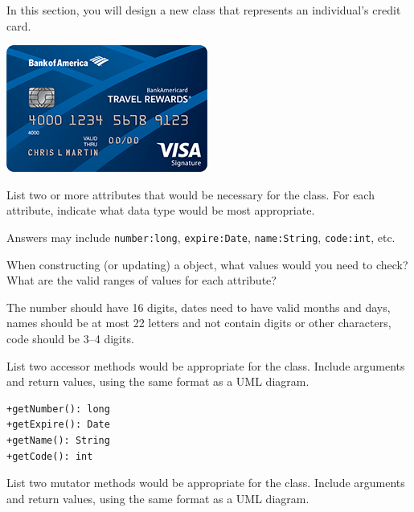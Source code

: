 
In this section, you will design a new class that represents an individual's credit card.

\begin{center}
\includegraphics{credit-card.png}
\end{center}




\Q List two or more attributes that would be necessary for the  class.
For each attribute, indicate what data type would be most appropriate.

\begin{answer}[3em]
Answers may include \verb|number:long|, \verb|expire:Date|, \verb|name:String|, \verb|code:int|, etc.
\end{answer}


\Q When constructing (or updating) a  object, what values would you need to check?
What are the valid ranges of values for each attribute?

\begin{answer}
The number should have 16 digits, dates need to have valid months and days, names should be at most 22 letters and not contain digits or other characters, code should be 3--4 digits.
\end{answer}


\Q List two accessor methods would be appropriate for the  class.
Include arguments and return values, using the same format as a UML diagram.

\begin{answer}[6em]
\begin{verbatim}
+getNumber(): long
+getExpire(): Date
+getName(): String
+getCode(): int
\end{verbatim}
\end{answer}


\Q List two mutator methods would be appropriate for the  class.
Include arguments and return values, using the same format as a UML diagram.


